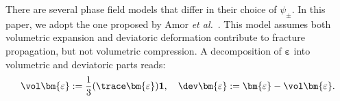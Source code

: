 There are several phase field models that differ in their choice of $\psi_{\pm}$. In this paper, we {adopt} the one proposed by Amor \emph{et al.}~\cite{Amor09}.
This model %
assumes both volumetric expansion and deviatoric deformation contribute to fracture propagation, but not volumetric compression. A decomposition of $\bm{\varepsilon}$ into volumetric and deviatoric parts reads:
\begin{equation}
    \begin{aligned}
        \vol\bm{\varepsilon} := \frac{1}{3} (\trace\bm{\varepsilon}) \mathbf{1}, \quad
        \dev\bm{\varepsilon} := \bm{\varepsilon} - \vol\bm{\varepsilon}.
    \end{aligned}
\end{equation}



